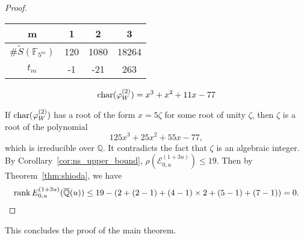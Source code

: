 \documentclass[main]{subfiles}
\begin{document}
\begin{proof}
    \begin{table}[ht]
        \centering
        \begin{tabular}{|c|c|c|c|}
            \hline
            m                                & 1   & 2    & 3     \\
            \hline
            $\# \tilde{S}(\mathbb{F}_{5^m})$ & 120 & 1080 & 18264 \\
            \hline
            $t_m$                            & -1  & -21  & 263   \\
            \hline
        \end{tabular}
        \label{tab:sample}
    \end{table}

    \begin{equation*}
        \operatorname{char}(\varphi_{W}^{(2)}) = x^{3} + x^{2} + 11 x - 77
    \end{equation*}

    If $\operatorname{char} (\varphi_{W}^{(2)})$ has a root of the form $x=5 \zeta$ for some root of unity $\zeta$, then $\zeta$ is a root of the polynomial
    \begin{equation*}
        125x^{3} + 25x^{2} + 55 x - 77,
    \end{equation*}
    which is irreducible over $\mathbb{Q}$.
    It contradicts the fact that $\zeta$ is an algebraic integer.
    By Corollary~\ref{cor:ns_upper_bound}, $\rho(\mathcal{E}_{0,u}^{(1 + 3u)}) \leq 19$.
    Then by Theorem~\ref{thm:shioda}, we have
    \begin{equation*}
        \operatorname{rank} E_{0,u}^{(1 + 3u)}(\overline{\mathbb{Q}}(u)) \leq 19 - (2 + (2 - 1) + (4 - 1) \times 2 + (5 - 1) + (7 - 1)) = 0.
    \end{equation*}
\end{proof}

This concludes the proof of the main theorem.
\end{document}
